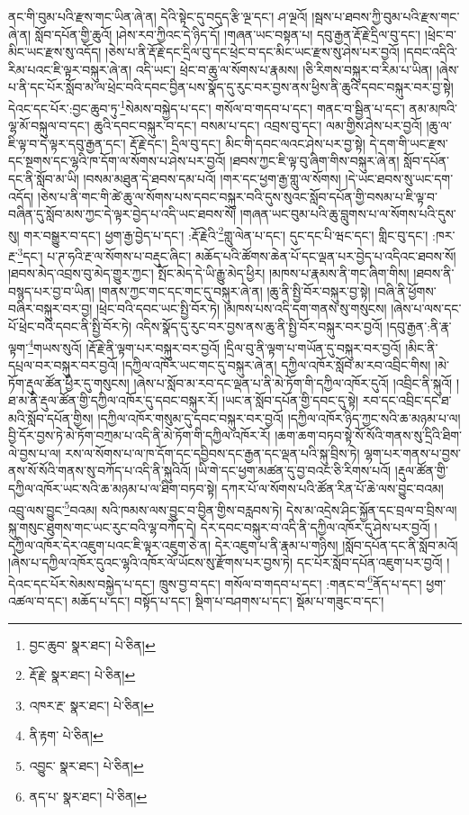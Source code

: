 ནང་གི་བུམ་པའི་རྫས་གང་ཡིན་ཞེ་ན། དེའི་སྟེང་དུ་བདུད་རྩི་ལྔ་དང་། ཤ་ལྔའོ། །སྦས་པ་ཐབས་ཀྱི་བུམ་པའི་རྫས་གང་ཞེ་ན། སློབ་དཔོན་གྱི་ཆུའོ། །ཤེས་རབ་ཀྱིའང་དེ་ཉིད་དོ། །གཞན་ཡང་བསྟན་པ། དབུ་རྒྱན་རྡོ་རྗེ་དྲིལ་བུ་དང་། །ཕྲེང་བ་མིང་ཡང་རྫས་སུ་འདོད། །ཅེས་པ་ནི་རྡོ་རྗེ་དང་དྲིལ་བུ་དང་ཕྲེང་བ་དང་མིང་ཡང་རྫས་སུ་ཤེས་པར་བྱའོ། །དབང་འདིའི་རིམ་པའང་ཇི་ལྟར་བསྐུར་ཞེ་ན། འདི་ཡང་། ཕྲེང་བ་ཆུ་ལ་སོགས་པ་རྣམས། །ཅི་རིགས་བསྐུར་བ་རིམ་པ་ཡིན། །ཞེས་པ་ནི་དང་པོར་སློབ་མ་ལ་ཕྲེང་བའི་དབང་བྱིན་པས་སྣོད་དུ་རུང་བར་བྱས་ནས་ཕྱིས་ནི་ཆུའི་དབང་བསྐུར་བར་བྱ་སྟེ། དེའང་དང་པོར་:བྱང་ཆུབ་ཏུ་\footnote{བྱང་ཆུབ་  སྣར་ཐང་།  པེ་ཅིན། }སེམས་བསྐྱེད་པ་དང་། གསོལ་བ་གདབ་པ་དང་། གནང་བ་སྦྱིན་པ་དང་། ནམ་མཁའི་ལྷ་མོ་བསྐུལ་བ་དང་། ཆུའི་དབང་བསྐུར་བ་དང་། བསམ་པ་དང་། འབྲས་བུ་དང་། ལམ་གྱིས་ཤེས་པར་བྱའོ། །ཆུ་ལ་ཇི་ལྟ་བ་དེ་ལྟར་དབུ་རྒྱན་དང་། རྡོ་རྗེ་དང་། དྲིལ་བུ་དང་། མིང་གི་དབང་ལའང་ཤེས་པར་བྱ་སྟེ། དེ་དག་གི་ཡང་རྫས་དང་སྔགས་དང་ལྷའི་ཁ་དོག་ལ་སོགས་པ་ཤེས་པར་བྱའོ། །ཐབས་ཀྱང་ཇི་ལྟ་བུ་ཞིག་གིས་བསྐུར་ཞེ་ན། སློབ་དཔོན་དང་ནི་སློབ་མ་ཡི། །བསམ་མཐུན་དེ་ཐབས་དམ་པའོ། །གར་དང་ཕྱག་རྒྱ་གླུ་ལ་སོགས། །དེ་ཡང་ཐབས་སུ་ཡང་དག་འདོད། །ཅེས་པ་ནི་གང་གི་ཚེ་ཆུ་ལ་སོགས་པས་དབང་བསྐུར་བའི་དུས་སུའང་སློབ་དཔོན་གྱི་བསམ་པ་ཇི་ལྟ་བ་བཞིན་དུ་སློབ་མས་ཀྱང་དེ་ལྟར་བྱེད་པ་འདི་ཡང་ཐབས་སོ། །གཞན་ཡང་བུམ་པའི་ཆུ་བླུགས་པ་ལ་སོགས་པའི་དུས་སུ། གར་བསྒྱུར་བ་དང་། ཕྱག་རྒྱ་བྱེད་པ་དང་། :རྡོ་རྗེའི་\footnote{རྡོ་རྗེ་  སྣར་ཐང་།  པེ་ཅིན། }གླུ་ལེན་པ་དང་། དུང་དང་པི་ཝང་དང་། གླིང་བུ་དང་། :ཁར་རྔ་\footnote{འཁར་རྔ་  སྣར་ཐང་།  པེ་ཅིན། }དང་། པ་ཊ་ཧའི་རྔ་ལ་སོགས་པ་བརྡུང་ཞིང་། མཆོད་པའི་ཚོགས་ཆེན་པོ་དང་ལྡན་པར་བྱེད་པ་འདིའང་ཐབས་སོ། །ཐབས་མེད་འབྲས་བུ་མེད་གྱུར་ཀྱང་། སྤོང་མེད་དེ་ཡི་རྒྱུ་མེད་ཕྱིར། །མཁས་པ་རྣམས་ནི་གང་ཞིག་གིས། །ཐབས་ནི་བསྙད་པར་བྱ་བ་ཡིན། །གནས་ཀྱང་གང་དང་གང་དུ་བསྐུར་ཞེ་ན། །ཆུ་ནི་སྤྱི་བོར་བསྐུར་བྱ་སྟེ། །བཞི་ནི་ཕྱོགས་བཞིར་བསྐུར་བར་བྱ། །ཕྲེང་བའི་དབང་ཡང་སྤྱི་བོར་ཏེ། །མཁས་པས་འདི་དག་གནས་སུ་གསུངས། །ཞེས་པ་ལས་དང་པོ་ཕྲེང་བའི་དབང་ནི་སྤྱི་བོར་ཏེ། འདིས་སྣོད་དུ་རུང་བར་བྱས་ནས་ཆུ་ནི་སྤྱི་བོར་བསྐུར་བར་བྱའོ། །དབུ་རྒྱན་:ནི་རྣ་ལྟག་\footnote{ནི་རྟག་  པེ་ཅིན། }གཡས་སུའོ། །རྡོ་རྗེ་ནི་ལྟག་པར་བསྐུར་བར་བྱའོ། །དྲིལ་བུ་ནི་ལྟག་པ་གཡོན་དུ་བསྐུར་བར་བྱའོ། །མིང་ནི་དཔྲལ་བར་བསྐུར་བར་བྱའོ། །དཀྱིལ་འཁོར་ཡང་གང་དུ་བསྐུར་ཞེ་ན། དཀྱིལ་འཁོར་སློབ་མ་རབ་འབྲིང་གིས། །མེ་ཏོག་རྡུལ་ཚོན་ཕྱིར་དུ་གསུངས། །ཞེས་པ་སློབ་མ་རབ་དང་ལྡན་པ་ནི་མེ་ཏོག་གི་དཀྱིལ་འཁོར་དུའོ། །འབྲིང་ནི་སྐུའོ། །ཐ་མ་ནི་རྡུལ་ཚོན་གྱི་དཀྱིལ་འཁོར་དུ་དབང་བསྐུར་རོ། །ཡང་ན་སློབ་དཔོན་གྱི་དབང་དུ་སྟེ། རབ་དང་འབྲིང་དང་ཐ་མའི་སློབ་དཔོན་གྱིས། །དཀྱིལ་འཁོར་གསུམ་དུ་དབང་བསྐུར་བར་བྱའོ། །དཀྱིལ་འཁོར་ཉིད་ཀྱང་སའི་ཆ་མཉམ་པ་ལ། བྱི་དོར་བྱས་ཏེ་མེ་ཏོག་བཀྲམ་པ་འདི་ནི་མེ་ཏོག་གི་དཀྱིལ་འཁོར་རོ། །ཆག་ཆག་བཏབ་སྟེ་སོ་སོའི་གནས་སུ་དྲིའི་ཐིག་ལེ་བྱས་པ་ལ། རས་ལ་སོགས་པ་ལ་ཁ་དོག་དང་དབྱིབས་དང་རྒྱན་དང་ལྡན་པའི་སྐུ་བྲིས་ཏེ། ལྷག་པར་གནས་པ་བྱས་ནས་སོ་སོའི་གནས་སུ་བཀོད་པ་འདི་ནི་སྐུའིའོ། །ཡི་གེ་དང་ཕྱག་མཚན་དུ་བྱ་བའང་ཅི་རིགས་པའོ། །རྡུལ་ཚོན་གྱི་དཀྱིལ་འཁོར་ཡང་སའི་ཆ་མཉམ་པ་ལ་ཐིག་བཏབ་སྟེ། དཀར་པོ་ལ་སོགས་པའི་ཚོན་རིན་པོ་ཆེ་ལས་བྱུང་བའམ། འབྲུ་ལས་བྱུང་\footnote{འབྱུང་  སྣར་ཐང་།  པེ་ཅིན། }བའམ། སའི་ཁམས་ལས་བྱུང་བ་བྱིན་གྱིས་བརླབས་ཏེ། དེས་མ་འདྲེས་ཤིང་སྐྱོན་དང་བྲལ་བ་བྲིས་ལ། སྐུ་གསུང་ཐུགས་གང་ཡང་རུང་བའི་ལྷ་བཀོད་དེ། དེར་དབང་བསྐུར་བ་འདི་ནི་དཀྱིལ་འཁོར་དུ་ཤེས་པར་བྱའོ། །དཀྱིལ་འཁོར་དེར་འཇུག་པའང་ཇི་ལྟར་འཇུག་ཅེ་ན། དེར་འཇུག་པ་ནི་རྣམ་པ་གཉིས། །སློབ་དཔོན་དང་ནི་སློབ་མའོ། །ཞེས་པ་དཀྱིལ་འཁོར་དུའང་ལྷའི་འཁོར་ལོ་ཡོངས་སུ་རྫོགས་པར་བྱས་ཏེ། དང་པོར་སློབ་དཔོན་འཇུག་པར་བྱའོ། །དེའང་དང་པོར་སེམས་བསྐྱེད་པ་དང་། ཁྲུས་བྱ་བ་དང་། གསོལ་བ་གདབ་པ་དང་། :གནང་བ་\footnote{ནད་པ་  སྣར་ཐང་།  པེ་ཅིན། }ནོད་པ་དང་། ཕྱག་འཚལ་བ་དང་། མཆོད་པ་དང་། བསྟོད་པ་དང་། སྡིག་པ་བཤགས་པ་དང་། སྡོམ་པ་གཟུང་བ་དང་། 